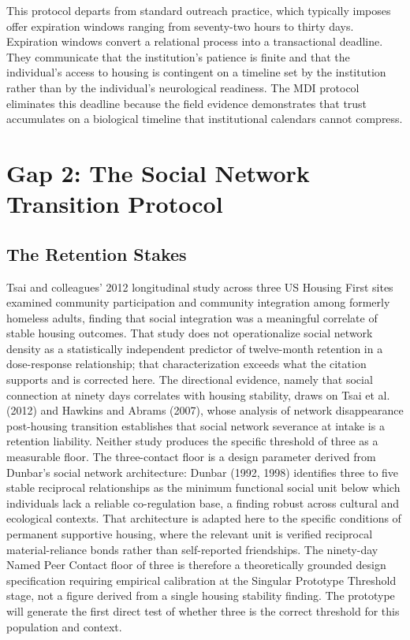 \documentclass[12pt, letterpaper]{article}
\begin{document}
This protocol departs from standard outreach practice, which typically imposes offer expiration windows ranging from seventy-two hours to thirty days. Expiration windows convert a relational process into a transactional deadline. They communicate that the institution's patience is finite and that the individual's access to housing is contingent on a timeline set by the institution rather than by the individual's neurological readiness. The MDI protocol eliminates this deadline because the field evidence demonstrates that trust accumulates on a biological timeline that institutional calendars cannot compress.


\section{Gap 2: The Social Network Transition Protocol}

\subsection{The Retention Stakes}

Tsai and colleagues' 2012 longitudinal study across three US Housing First sites examined community participation and community integration among formerly homeless adults, finding that social integration was a meaningful correlate of stable housing outcomes. That study does not operationalize social network density as a statistically independent predictor of twelve-month retention in a dose-response relationship; that characterization exceeds what the citation supports and is corrected here. The directional evidence, namely that social connection at ninety days correlates with housing stability, draws on Tsai et al. (2012) and Hawkins and Abrams (2007), whose analysis of network disappearance post-housing transition establishes that social network severance at intake is a retention liability. Neither study produces the specific threshold of three as a measurable floor. The three-contact floor is a design parameter derived from Dunbar's social network architecture: Dunbar (1992, 1998) identifies three to five stable reciprocal relationships as the minimum functional social unit below which individuals lack a reliable co-regulation base, a finding robust across cultural and ecological contexts. That architecture is adapted here to the specific conditions of permanent supportive housing, where the relevant unit is verified reciprocal material-reliance bonds rather than self-reported friendships. The ninety-day Named Peer Contact floor of three is therefore a theoretically grounded design specification requiring empirical calibration at the Singular Prototype Threshold stage, not a figure derived from a single housing stability finding. The prototype will generate the first direct test of whether three is the correct threshold for this population and context.
\end{document}
